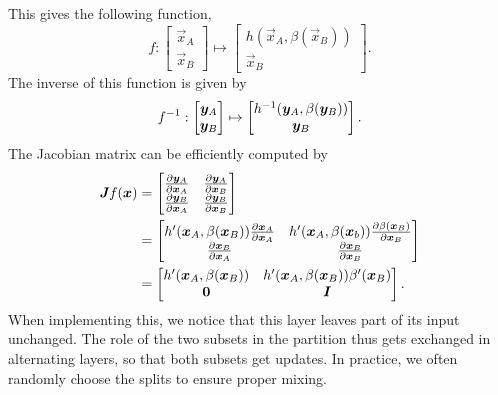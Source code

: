 This gives the following function, \[
    f: \begin{bmatrix} \vec{x}_A \\ \vec{x}_B \end{bmatrix} \mapsto \begin{bmatrix} h(\vec{x}_A, \beta(\vec{x}_B)) \\ \vec{x}_B \end{bmatrix}.
\]
The inverse of this function is given by \[
    f^{-1}: \begin{bmatrix} \bm{y}_A \\ \bm{y}_B \end{bmatrix} \mapsto \begin{bmatrix} h^{-1}(\bm{y}_A, \beta(\bm{y}_B)) \\ \bm{y}_B \end{bmatrix}.
\]
The Jacobian matrix can be efficiently computed by
\begin{align*}
    \bm{J}_{} f(\bm{x}) & = \begin{bmatrix}
                                 \pdv{\bm{y}_A}{\bm{x}_A} & \pdv{\bm{y}_A}{\bm{x}_B} \\
                                 \pdv{\bm{y}_B}{\bm{x}_A} & \pdv{\bm{y}_B}{\bm{x}_B}
                             \end{bmatrix}                                                                        \\
                         & = \begin{bmatrix}
                                 h'(\bm{x}_A, \beta(\bm{x}_B)) \pdv{\bm{x}_A}{\bm{x}_A} & h'(\bm{x}_A, \beta(\bm{x}_b)) \pdv{\beta(\bm{x}_B)}{\bm{x}_B} \\
                                 \pdv{\bm{x}_B}{\bm{x}_A}                                 & \pdv{\bm{x}_B}{\bm{x}_B}
                             \end{bmatrix} \\
                         & = \begin{bmatrix}
                                 h'(\bm{x}_A, \beta(\bm{x}_B)) & h'(\bm{x}_A, \beta(\bm{x}_B)) \beta'(\bm{x}_B) \\
                                 \bm{0}                         & \bm{I}
                             \end{bmatrix}.
\end{align*}
When implementing this, we notice that this layer leaves part of its input unchanged. The role of
the two subsets in the partition thus gets exchanged in alternating layers, so that both subsets
get updates. In practice, we often randomly choose the splits to ensure proper mixing.

